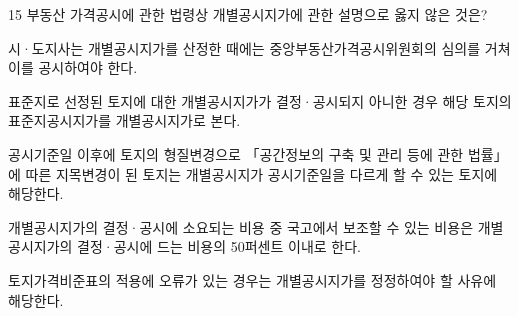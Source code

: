 \begin{question}{15}
부동산 가격공시에 관한 법령상 개별공시지가에 관한 설명으로 옳지 않은 것은?
\begin{choices}
  \item 시·도지사는 개별공시지가를 산정한 때에는 중앙부동산가격공시위원회의 심의를 거쳐 이를 공시하여야 한다.
  \item 표준지로 선정된 토지에 대한 개별공시지가가 결정·공시되지 아니한 경우 해당 토지의 표준지공시지가를 개별공시지가로 본다.
  \item 공시기준일 이후에 토지의 형질변경으로 「공간정보의 구축 및 관리 등에 관한 법률」에 따른 지목변경이 된 토지는 개별공시지가 공시기준일을 다르게 할 수 있는 토지에 해당한다.
  \item 개별공시지가의 결정·공시에 소요되는 비용 중 국고에서 보조할 수 있는 비용은 개별공시지가의 결정·공시에 드는 비용의 50퍼센트 이내로 한다.
  \item 토지가격비준표의 적용에 오류가 있는 경우는 개별공시지가를 정정하여야 할 사유에 해당한다.
\end{choices}
\end{question}
